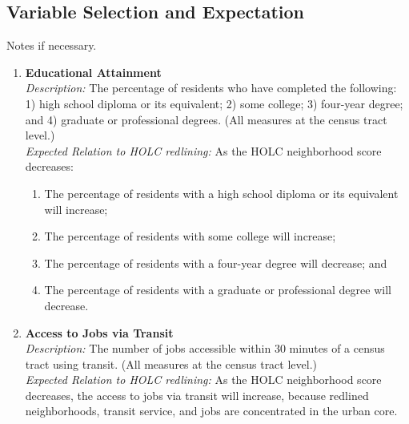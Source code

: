 \documentclass[paper=letter, fontsize=12pt]{scrartcl} %
\begin{document}
\subsection{Variable Selection and Expectation}
Notes if necessary.\par
\begin{enumerate}
	\item \textbf{Educational Attainment}\\
	\textit{Description:} The percentage of residents who have completed the following: 1) high school diploma or its equivalent; 2) some college; 3) four-year degree; and 4) graduate or professional degrees. (All measures at the census tract level.)\\
	\textit{Expected Relation to HOLC redlining:} As the HOLC neighborhood score decreases:
	\begin{enumerate}
		\item The percentage of residents with a high school diploma or its equivalent will increase;
		\item The percentage of residents with some college will increase;
		\item The percentage of residents with a four-year degree will decrease; and
		\item The percentage of residents with a graduate or professional degree will decrease.
	\end{enumerate}
	
	\item \textbf{Access to Jobs via Transit}\\
	\textit{Description:} The number of jobs accessible within 30 minutes of a census tract using transit. (All measures at the census tract level.)\\
	\textit{Expected Relation to HOLC redlining:} As the HOLC neighborhood score decreases, the access to jobs via transit will increase, because redlined neighborhoods, transit service, and jobs are concentrated in the urban core.
	

\end{enumerate}
\end{document}
